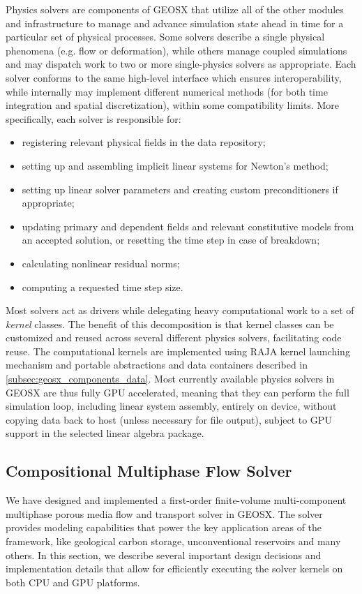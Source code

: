 Physics solvers are components of GEOSX that utilize all of the other modules and infrastructure to manage and advance simulation state ahead in time for a particular set of physical processes.   Some solvers describe a single physical phenomena (e.g. flow or deformation), while others manage coupled simulations and may dispatch work to two or more single-physics solvers as appropriate.   Each solver conforms to the same high-level interface which ensures interoperability, while internally may implement different numerical methods (for both time integration and spatial discretization), within some compatibility limits.   More specifically, each solver is responsible for:
\begin{itemize}
    \item registering relevant physical fields in the data repository;
    \item setting up and assembling implicit linear systems for Newton's method;
    \item setting up linear solver parameters and creating custom preconditioners if appropriate;
    \item updating primary and dependent fields and relevant constitutive models from an accepted solution, or resetting the time step in case of breakdown;
    \item calculating nonlinear residual norms;
    \item computing a requested time step size.
\end{itemize}
Most solvers act as drivers while delegating heavy computational work to a set of \textit{kernel} classes.   The benefit of this decomposition is that kernel classes can be customized and reused across several different physics solvers, facilitating code reuse.   The computational kernels are implemented using RAJA kernel launching mechanism and portable abstractions and data containers described in \cref{subsec:geosx_components_data}.   Most currently available physics solvers in GEOSX are thus fully GPU accelerated, meaning that they can perform the full simulation loop, including linear system assembly, entirely on device, without copying data back to host (unless necessary for file output), subject to GPU support in the selected linear algebra package.

\subsection{Compositional Multiphase Flow Solver}

We have designed and implemented a first-order finite-volume multi-component multiphase porous media flow and transport solver in GEOSX.   The solver provides modeling capabilities that power the key application areas of the framework, like geological carbon storage, unconventional reservoirs and many others.   In this section, we describe several important design decisions and implementation details that allow for efficiently executing the solver kernels on both CPU and GPU platforms.

